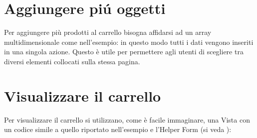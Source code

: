 \section*{Aggiungere pi\'u oggetti}
Per aggiungere più prodotti al carrello bisogna affidarsi ad un array multidimensionale come nell'esempio: in questo modo tutti i dati vengono inseriti in una singola azione. Questo è utile per permettere agli utenti di scegliere tra diversi elementi collocati sulla stessa pagina.


\label{sec:vedicarrello}
\section*{Visualizzare il carrello}
Per visualizzare il carrello si utilizzano, come è facile immaginare, una Vista con un codice simile a quello riportato nell'esempio e l'Helper Form (si veda ):

